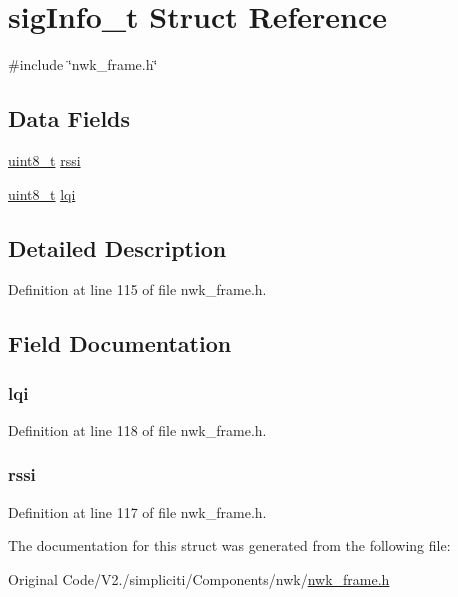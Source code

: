 \hypertarget{structsigInfo__t}{\section{sig\-Info\-\_\-t \-Struct \-Reference}
\label{structsigInfo__t}
}


{\ttfamily \#include \char`\"{}nwk\-\_\-frame.\-h\char`\"{}}

\subsection*{\-Data \-Fields}
\begin{DoxyCompactItemize}
\item 
\hyperlink{bsp__msp430__defs_8h_aba7bc1797add20fe3efdf37ced1182c5}{uint8\-\_\-t} \hyperlink{structsigInfo__t_afb67d818cd76cce8057affabcb1979a6}{rssi}
\item 
\hyperlink{bsp__msp430__defs_8h_aba7bc1797add20fe3efdf37ced1182c5}{uint8\-\_\-t} \hyperlink{structsigInfo__t_a0dd69605aea6dba42ffd851067dbfe77}{lqi}
\end{DoxyCompactItemize}


\subsection{\-Detailed \-Description}


\-Definition at line 115 of file nwk\-\_\-frame.\-h.



\subsection{\-Field \-Documentation}
\hypertarget{structsigInfo__t_a0dd69605aea6dba42ffd851067dbfe77}{
\subsubsection[{lqi}]{ {\bf lqi}}}\label{structsigInfo__t_a0dd69605aea6dba42ffd851067dbfe77}


\-Definition at line 118 of file nwk\-\_\-frame.\-h.

\hypertarget{structsigInfo__t_afb67d818cd76cce8057affabcb1979a6}{
\subsubsection[{rssi}]{ {\bf rssi}}}\label{structsigInfo__t_afb67d818cd76cce8057affabcb1979a6}


\-Definition at line 117 of file nwk\-\_\-frame.\-h.



\-The documentation for this struct was generated from the following file\-:\begin{DoxyCompactItemize}
\item 
\-Original Code/\-V2./simpliciti/\-Components/nwk/\hyperlink{nwk__frame_8h}{nwk\-\_\-frame.\-h}\end{DoxyCompactItemize}
